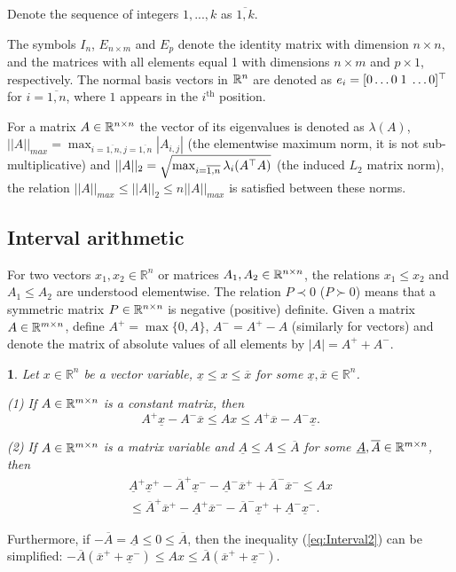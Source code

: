 \documentclass[twocolumn,english]{IEEEtran}
\theoremstyle{plain}
\newtheorem{lem}{\protect\lemmaname}
\theoremstyle{definition}
\theoremstyle{plain}
\theoremstyle{plain}
\theoremstyle{remark}
\providecommand{\lemmaname}{Lemma}
\begin{document}
Denote the sequence of integers $1,...,k$ as $\overline{1,k}$. 

The symbols $I_{n}$, $E_{n\times m}$ and $E_{p}$ denote the identity matrix with dimension $n\times n$, and the matrices with all elements equal 1 with dimensions $n\times m$ and $p\times1$, respectively. The normal basis vectors in $\mathbb{R}^{n}$ are denoted as $e_{i}=[0\dots0\;1\;\dots0]^{\top}$ for $i=\overline{1,n}$, where $1$ appears in the $i^{\text{th}}$ position.

For a matrix $A\in\mathbb{R}^{n\times n}$ the vector of its eigenvalues is denoted as $\lambda(A)$, $||A||_{max}=\max_{i=\overline{1,n},j=\overline{1,n}}|A_{i,j}|$ (the elementwise maximum norm, it is not sub-multiplicative) and $||A||_{2}=\sqrt{\max_{i=\overline{1,n}}\lambda_{i}(A^{\top} A)}$ (the induced $L_{2}$ matrix norm), the relation $||A||_{max}\le||A||_{2}\le n||A||_{max}$ is satisfied between these norms.

\subsection{Interval arithmetic}

For two vectors $x_{1},x_{2}\in\mathbb{R}^{n}$ or matrices $A_{1},A_{2}\in\mathbb{R}^{n\times n}$, the relations $x_{1}\le x_{2}$ and $A_{1}\le A_{2}$ are understood elementwise. The relation $P\prec0$ ($P\succ0$) means that a symmetric matrix $P\in\mathbb{R}^{n\times n}$ is negative (positive) definite. Given a matrix $A\in\mathbb{R}^{m\times n}$, define $A^{+}=\max\{0,A\}$, $A^{-}=A^{+}-A$ (similarly for vectors) and denote the matrix of absolute values of all elements by $|A|=A^{+}+A^{-}$. 
\begin{lem}
\textup{\cite{EFRZS12}} \label{lem:interval} Let $x\in\mathbb{R}^{n}$ be a vector variable, $\underline{x}\le x\le\overline{x}$ for some $\underline{x},\overline{x}\in\mathbb{R}^{n}$. 

\textup{(1)} If $A\in\mathbb{R}^{m\times n}$ is a constant matrix, then
\begin{equation}
A^{+}\underline{x}-A^{-}\overline{x}\le Ax\le A^{+}\overline{x}-A^{-}\underline{x}.\label{eq:Interval1}
\end{equation}

\textup{(2)} If $A\in\mathbb{R}^{m\times n}$ is a matrix variable and \textup{$\underline{A}\le A\le\overline{A}$} for some $\underline{A},\overline{A}\in\mathbb{R}^{m\times n}$, then
\begin{gather}
\underline{A}^{+}\underline{x}^{+}-\overline{A}^{+}\underline{x}^{-}-\underline{A}^{-}\overline{x}^{+}+\overline{A}^{-}\overline{x}^{-}\leq Ax\label{eq:Interval2}\\
\leq\overline{A}^{+}\overline{x}^{+}-\underline{A}^{+}\overline{x}^{-}-\overline{A}^{-}\underline{x}^{+}+\underline{A}^{-}\underline{x}^{-}.\nonumber 
\end{gather}
\end{lem}
Furthermore, if $-\overline{A}=\underline{A}\le0\le\overline{A}$, then the inequality (\ref{eq:Interval2}) can be simplified: $-\overline{A}(\overline{x}^{+}+\underline{x}^{-})\leq Ax\leq\overline{A}(\overline{x}^{+}+\underline{x}^{-})$.
\end{document}

